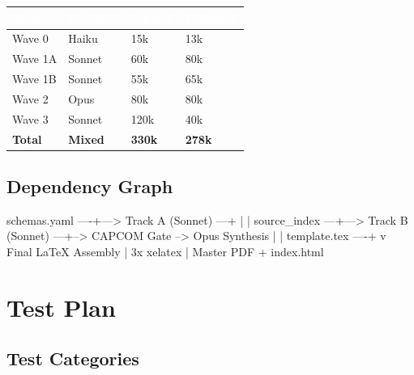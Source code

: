 \documentclass[11pt,letterpaper]{article}
\newcommand{\tableheader}[1]{\textbf{\sffamily\textcolor{white}{#1}}}
\begin{document}
\begin{center}
\begin{tabularx}{\textwidth}{L{3cm}C{2cm}C{2cm}C{2.5cm}}
\toprule
{}
\tableheader{Wave} & \tableheader{Model(s)} & \tableheader{Input k} & \tableheader{Output k} \\
\midrule
Wave 0 & Haiku & 15k & 13k \\
Wave 1A & Sonnet & 60k & 80k \\
Wave 1B & Sonnet & 55k & 65k \\
Wave 2 & Opus & 80k & 80k \\
Wave 3 & Sonnet & 120k & 40k \\
\midrule
{}
\textbf{Total} & \textbf{Mixed} & \textbf{330k} & \textbf{278k} \\
\bottomrule
\end{tabularx}
\end{center}

\subsection{Dependency Graph}

\begin{asciibox}
schemas.yaml ----+---> Track A (Sonnet) ---+
                 |                          |
source_index  ---+---> Track B (Sonnet) ---+--> CAPCOM Gate --> Opus Synthesis
                 |                                                    |
template.tex ----+                                                    v
                                                              Final LaTeX Assembly
                                                                      |
                                                                 3x xelatex
                                                                      |
                                                                 Master PDF
                                                                  + index.html
\end{asciibox}

\section{Test Plan}

\subsection{Test Categories}
\end{document}
